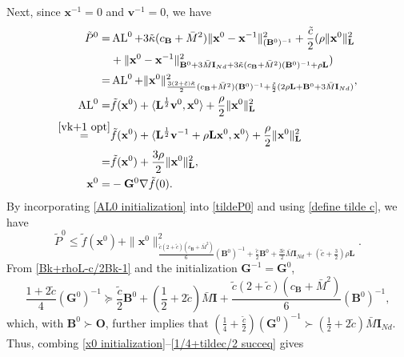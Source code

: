 \documentclass[10pt,a4paper]{amsart}
\begin{document}
Next, since $\mathbf{x}^{-1}=0$ and $\mathbf{v}^{-1}=0$, we have
\begin{align}
	\tilde{P}^0 =& \operatorname{AL}^0+3\tilde{\kappa}(c_{\mathbf{B}}+\bar{M}^2)\|\mathbf{x}^0-\mathbf{x}^{-1}\|^2_{(\mathbf{B}^{0})^{-1}}+\frac{\tilde{c}}{2}(\rho \|\mathbf{x}^0\|^2_\mathbf{L}\notag\\
    &+\|\mathbf{x}^0-\mathbf{x}^{-1}\|^2_{\mathbf{B}^{0}+3\bar{M}\mathbf{I}_{Nd}+3\tilde{\kappa}(c_{\mathbf{B}}+\bar{M}^2)(\mathbf{B}^{0})^{-1}+\rho \mathbf{L}})\notag\\
	=& \operatorname{AL}^0+\|\mathbf{x}^0\|^2_{\frac{3(2+\tilde{c})\tilde{\kappa}}{2}(c_{\mathbf{B}}+\bar{M}^2)(\mathbf{B}^{0})^{-1}+\frac{\tilde{c}}{2}(2\rho \mathbf{L} +\mathbf{B}^0+3\bar{M}\mathbf{I}_{Nd})}, \label{tildeP0} \\
	\operatorname{AL}^0=&\tilde{f}(\mathbf{x}^0)+\langle \mathbf{L}^{\frac{1}{2}}\mathbf{v}^0,\mathbf{x}^0\rangle+\frac{\rho}{2}\|\mathbf{x}^0\|^2_\mathbf{L} \notag\\
	\overset{\eqref{vk+1 opt}}{=}& \tilde{f}(\mathbf{x}^0)+\langle \mathbf{L}^{\frac{1}{2}}\mathbf{v}^{-1}+\rho \mathbf{L} \mathbf{x}^0,\mathbf{x}^0\rangle +\frac{\rho}{2}\|\mathbf{x}^0\|^2_\mathbf{L}\notag\\
	=& \tilde{f}(\mathbf{x}^0)+\frac{3\rho}{2}\|\mathbf{x}^0\|^2_\mathbf{L}, \label{AL0 initialization}\\
	\mathbf{x}^0 =& -\mathbf{G}^0\nabla \tilde{f}(0) . \label{x0 initialization}
\end{align}
By incorporating \eqref{AL0 initialization} into \eqref{tildeP0} and using \eqref{define tilde c}, we have
\begin{equation}
	\tilde{P}^0\leq \tilde{f}(\mathbf{x}^0)+\|\mathbf{x}^0\|^2_{\frac{\tilde{c}(2+\tilde{c})(c_{\mathbf{B}}+\bar{M}^2)}{6}(\mathbf{B}^0)^{-1}+\frac{\tilde{c}}{2}\mathbf{B}^0+\frac{3\tilde{c}}{2}\bar{M}\mathbf{I}_{Nd}+(\tilde{c}+\frac{3}{2})\rho \mathbf{L}}. \label{tildeP0 first}
\end{equation}
From \eqref{Bk+rhoL-c/2Bk-1} and the initialization $\mathbf{G}^{-1}=\mathbf{G}^0$, 
\begin{equation}
	\frac{1+2\tilde{c}}{4}(\mathbf{G}^0)^{-1} \succeq \frac{\tilde{c}}{2}\mathbf{B}^0+(\frac{1}{2}+2\tilde{c})\bar{M}\mathbf{I}+\frac{\tilde{c}(2+\tilde{c})(c_{\mathbf{B}}+\bar{M}^2)}{6}(\mathbf{B}^0)^{-1}, \label{1/4+tildec/2 succeq}
\end{equation}
which, with $\mathbf{B}^0\succ \mathbf{O}$, further implies that $(\frac{1}{4}+\frac{\tilde{c}}{2})(\mathbf{G}^0)^{-1}\succ (\frac{1}{2}+2\tilde{c})\bar{M}\mathbf{I}_{Nd}$. Thus, combing \eqref{x0 initialization}--\eqref{1/4+tildec/2 succeq} gives
\end{document}
